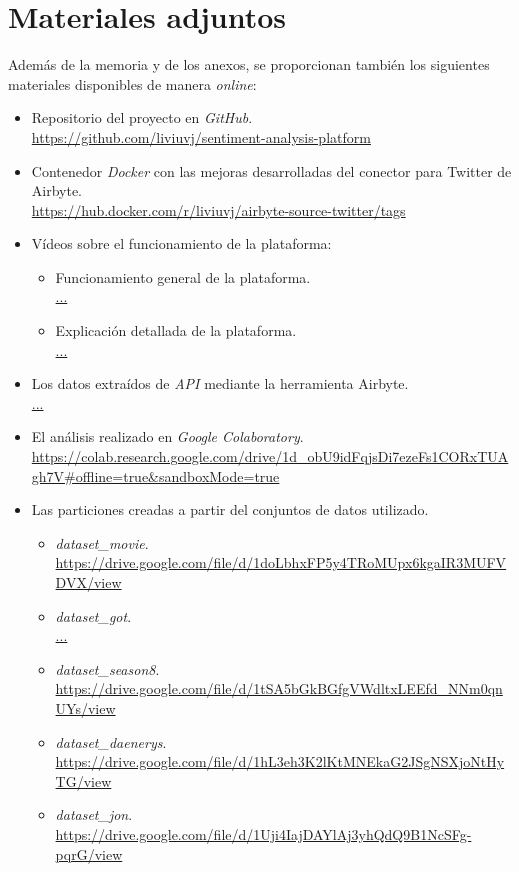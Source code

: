 \section{Materiales adjuntos}

Además de la memoria y de los anexos, se proporcionan también los siguientes materiales disponibles de manera \textit{online}:

\begin{itemize}
    \item Repositorio del proyecto en \textit{GitHub}.\\
        \url{https://github.com/liviuvj/sentiment-analysis-platform}
    
    \item Contenedor \textit{Docker} con las mejoras desarrolladas del conector para Twitter de  Airbyte.\\
        \url{https://hub.docker.com/r/liviuvj/airbyte-source-twitter/tags}

    \item Vídeos sobre el funcionamiento de la plataforma:
    \begin{itemize}
        \item Funcionamiento general de la plataforma.\\
            \url{...}
        \item Explicación detallada de la plataforma.\\
            \url{...}
    \end{itemize}

    \item Los datos extraídos de \textit{API} mediante la herramienta Airbyte.\\
        \url{...}

    \item El análisis realizado en \textit{Google Colaboratory}.\\
        \url{https://colab.research.google.com/drive/1d_obU9idFqjsDi7ezeFs1CORxTUAgh7V#offline=true&sandboxMode=true}

    \item Las particiones creadas a partir del conjuntos de datos utilizado.
    \begin{itemize}
        \item \textit{dataset\_movie}.\\
            \url{https://drive.google.com/file/d/1doLbhxFP5y4TRoMUpx6kgaIR3MUFVDVX/view}
        \item \textit{dataset\_got}.\\
            \url{...}
        \item \textit{dataset\_season8}.\\
            \url{https://drive.google.com/file/d/1tSA5bGkBGfgVWdltxLEEfd_NNm0qnUYs/view}
        \item \textit{dataset\_daenerys}.\\
            \url{https://drive.google.com/file/d/1hL3eh3K2lKtMNEkaG2JSgNSXjoNtHyTG/view}
        \item \textit{dataset\_jon}.\\
            \url{https://drive.google.com/file/d/1Uji4IajDAYlAj3yhQdQ9B1NcSFg-pqrG/view}
    \end{itemize}
    
\end{itemize}